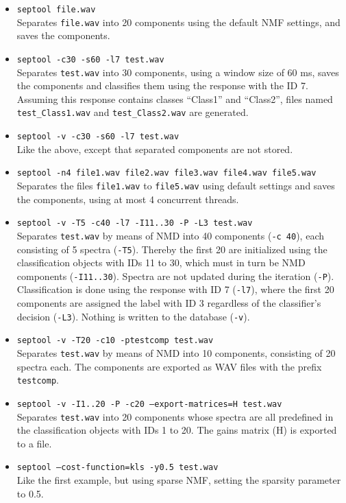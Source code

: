 \begin{itemize}
  \item {\tt septool file.wav} \\
    Separates {\tt file.wav} into 20 components using the default NMF settings,
    and saves the components.
  \item {\tt septool -c30 -s60 -l7 test.wav}\\
    Separates {\tt test.wav} into 30 components, using a window size of 60 ms,
    saves the components and classifies them using the response with the ID
    7. Assuming this response contains classes ``Class1'' and ``Class2'', files
    named {\tt test\_Class1.wav} and {\tt test\_Class2.wav} are generated.
  \item {\tt septool -v -c30 -s60 -l7 test.wav}\\
    Like the above, except that separated components are not stored.
  \item {\tt septool -n4 file1.wav file2.wav file3.wav file4.wav
      file5.wav}\\
    Separates the files {\tt file1.wav} to {\tt file5.wav} using default
    settings and saves the components, using at most 4 concurrent threads.
  \item {\tt septool -v -T5 -c40 -l7 -I11..30 -P -L3 test.wav}\\
    Separates {\tt test.wav} by means of NMD into 40 components
    ({\tt -c 40}), each consisting of 5 spectra ({\tt -T5}). Thereby the first
    20 are initialized using the classification objects with IDs 11 to 30,
    which must in turn be NMD components ({\tt -I11..30}). Spectra are not
    updated during the iteration ({\tt -P}).  Classification is done using the
    response with ID 7 ({\tt -l7}), where the first 20 components are assigned
    the label with ID 3 regardless of the classifier's decision ({\tt -L3}).
    Nothing is written to the database ({\tt -v}).
  \item {\tt septool -v -T20 -c10 -ptestcomp test.wav}\\
    Separates {\tt test.wav} by means of NMD into 10 components, consisting 
    of 20 spectra each. The components are exported as WAV files with the 
    prefix {\tt testcomp}.
  \item {\tt septool -v -I1..20 -P -c20 --export-matrices=H test.wav}\\
    Separates {\tt test.wav} into 20 components whose spectra are all 
    predefined in the classification objects with IDs 1 to 20.
    The gains matrix (H) is exported to a file.
  \item {\tt septool --cost-function=kls -y0.5 test.wav}\\
    Like the first example, but using sparse NMF, 
    setting the sparsity parameter to 0.5.
\end{itemize}


